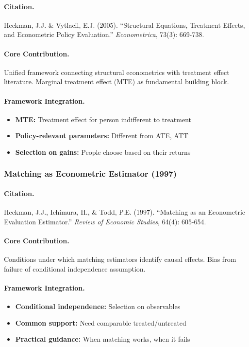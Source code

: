 \documentclass[12pt,a4paper]{article}
\begin{document}
\paragraph{Citation.}
Heckman, J.J. \& Vytlacil, E.J. (2005). ``Structural Equations, Treatment
Effects, and Econometric Policy Evaluation.'' \emph{Econometrica}, 73(3): 669-738.

\paragraph{Core Contribution.}
Unified framework connecting structural econometrics with treatment effect
literature. Marginal treatment effect (MTE) as fundamental building block.

\paragraph{Framework Integration.}
\begin{itemize}
  \item \textbf{MTE:} Treatment effect for person indifferent to treatment
  \item \textbf{Policy-relevant parameters:} Different from ATE, ATT
  \item \textbf{Selection on gains:} People choose based on their returns
\end{itemize}

\subsubsection{Matching as Econometric Estimator (1997)}

\paragraph{Citation.}
Heckman, J.J., Ichimura, H., \& Todd, P.E. (1997). ``Matching as an
Econometric Evaluation Estimator.'' \emph{Review of Economic Studies}, 64(4): 605-654.

\paragraph{Core Contribution.}
Conditions under which matching estimators identify causal effects.
Bias from failure of conditional independence assumption.

\paragraph{Framework Integration.}
\begin{itemize}
  \item \textbf{Conditional independence:} Selection on observables
  \item \textbf{Common support:} Need comparable treated/untreated
  \item \textbf{Practical guidance:} When matching works, when it fails
\end{itemize}
\end{document}
